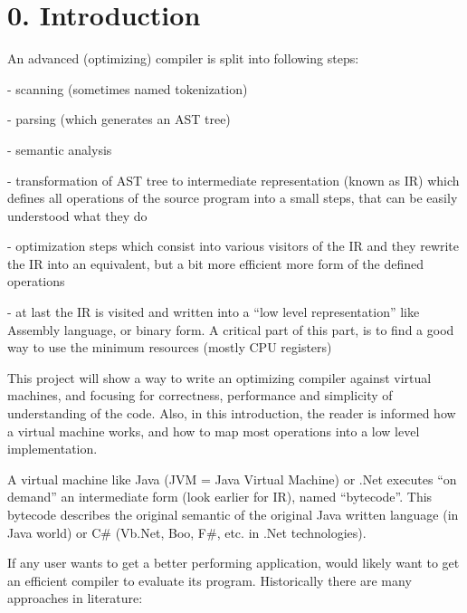 \documentclass[letterpaper]{article}
\begin{document}
\bigskip

\section{}
\clearpage\section[0. Introduction]{0. Introduction}

\bigskip

An advanced (optimizing) compiler is split into following steps:

{}- scanning (sometimes named tokenization)

{}- parsing (which generates an AST tree)

{}- semantic analysis

{}- transformation of AST tree to intermediate representation (known as IR) which defines all operations of the source
program into a small steps, that can be easily understood what they do

{}- optimization steps which consist into various visitors of the IR and they rewrite the IR into an equivalent, but a
bit more efficient more form of the defined operations

{}- at last the IR is visited and written into a ``low level representation'' like Assembly language, or binary form. A
critical part of this part, is to find a good way to use the minimum resources (mostly CPU registers)


\bigskip

This project will show a way to write an optimizing compiler against virtual machines, and focusing for correctness,
performance and simplicity of understanding of the code. Also, in this introduction, the reader is informed how a
virtual machine works, and how to map most operations into a low level implementation.


\bigskip

A virtual machine like Java (JVM = Java Virtual Machine) or .Net executes ``on demand'' an intermediate form (look
earlier for IR), named ``bytecode''. This bytecode describes the original semantic of the original Java written
language (in Java world) or C\# (Vb.Net, Boo, F\#, etc. in .Net technologies). 


\bigskip

If any user wants to get a better performing application, would likely want to get an efficient compiler to evaluate its
program. Historically there are many approaches in literature:
\end{document}
